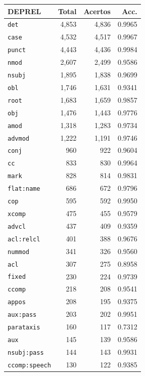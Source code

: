 \begin{table}[ht]
\centering
\footnotesize
\begin{tabular}{lrrr}
\toprule
\textbf{DEPREL} & \textbf{Total} & \textbf{Acertos} & \textbf{Acc.} \\
\midrule
\texttt{det} & 4,853 & 4,836 & 0.9965 \\
\texttt{case} & 4,532 & 4,517 & 0.9967 \\
\texttt{punct} & 4,443 & 4,436 & 0.9984 \\
\texttt{nmod} & 2,607 & 2,499 & 0.9586 \\
\texttt{nsubj} & 1,895 & 1,838 & 0.9699 \\
\texttt{obl} & 1,746 & 1,631 & 0.9341 \\
\texttt{root} & 1,683 & 1,659 & 0.9857 \\
\texttt{obj} & 1,476 & 1,443 & 0.9776 \\
\texttt{amod} & 1,318 & 1,283 & 0.9734 \\
\texttt{advmod} & 1,222 & 1,191 & 0.9746 \\
\texttt{conj} & 960 & 922 & 0.9604 \\
\texttt{cc} & 833 & 830 & 0.9964 \\
\texttt{mark} & 828 & 814 & 0.9831 \\
\texttt{flat\!:\!name} & 686 & 672 & 0.9796 \\
\texttt{cop} & 595 & 592 & 0.9950 \\
\texttt{xcomp} & 475 & 455 & 0.9579 \\
\texttt{advcl} & 437 & 409 & 0.9359 \\
\texttt{acl\!:\!relcl} & 401 & 388 & 0.9676 \\
\texttt{nummod} & 341 & 326 & 0.9560 \\
\texttt{acl} & 307 & 275 & 0.8958 \\
\texttt{fixed} & 230 & 224 & 0.9739 \\
\texttt{ccomp} & 218 & 208 & 0.9541 \\
\texttt{appos} & 208 & 195 & 0.9375 \\
\texttt{aux\!:\!pass} & 203 & 202 & 0.9951 \\
\texttt{parataxis} & 160 & 117 & 0.7312 \\
\texttt{aux} & 145 & 139 & 0.9586 \\
\texttt{nsubj\!:\!pass} & 144 & 143 & 0.9931 \\
\texttt{ccomp\!:\!speech} & 130 & 122 & 0.9385 \\

\end{tabular}
\end{table}
